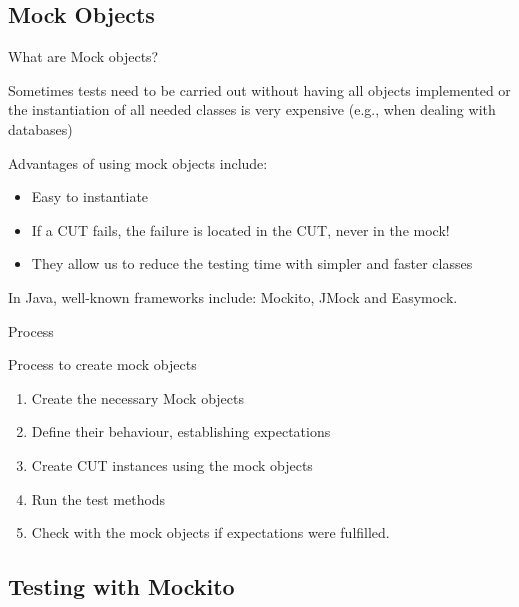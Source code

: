 \documentclass[11pt, xcolor=svgnames]{beamer}
\begin{document}
\subsection{Mock Objects}


\begin{frame}{What are Mock objects?}


Sometimes tests need to be carried out without having all objects implemented or the instantiation of all needed classes is very expensive (e.g., when dealing with databases)

Advantages of using mock objects include:

\begin{itemize}
 \item Easy to instantiate
 \item If a CUT fails, the failure is located in the CUT, never in the mock!
 \item They allow us to reduce the testing time with simpler and faster classes
\end{itemize}

In Java, well-known frameworks include: Mockito, JMock and Easymock.

\end{frame}


\begin{frame}{Process}

Process to create mock objects

\begin{enumerate}
 \item Create the necessary Mock objects
 \item Define their behaviour, establishing expectations
 \item Create CUT instances using the mock objects
 \item Run the test methods 
 \item Check with the mock objects if expectations were fulfilled. 
\end{enumerate}

\end{frame}



\subsection{Testing with Mockito}
\end{document}
